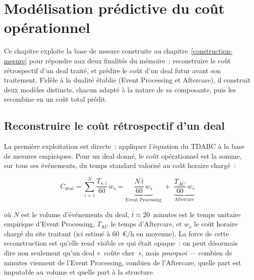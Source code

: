 \section{Modélisation prédictive du coût opérationnel}
\label{modelisation}

Ce chapitre exploite la base de mesure construite au chapitre~\ref{construction-mesure} pour répondre aux deux finalités du mémoire~: reconstruire le coût rétrospectif d'un deal traité, et prédire le coût d'un deal futur avant son traitement. Fidèle à la dualité établie (Event Processing et Aftercare), il construit deux modèles distincts, chacun adapté à la nature de sa composante, puis les recombine en un coût total prédit.

\subsection{Reconstruire le coût rétrospectif d'un deal}
\label{sec:cout-retro}

La première exploitation est directe~: appliquer l'équation du TDABC à la base de mesures empiriques. Pour un deal donné, le coût opérationnel est la somme, sur tous ses événements, du temps standard valorisé au coût horaire chargé~:

\begin{equation}
C_{deal} = \sum_{i=1}^{N} \frac{T_{s,i}}{60}\,w_s
= \underbrace{\frac{N\,\bar{t}}{60}\,w_s}_{\text{Event Processing}}
\;+\; \underbrace{\frac{T_{AC}}{60}\,w_s}_{\text{Aftercare}}
\end{equation}

\noindent où $N$ est le volume d'événements du deal, $\bar{t}\approx 20$~minutes est le temps unitaire empirique d'Event Processing, $T_{\text{AC}}$ le temps d'Aftercare, et $w_{s}$ le coût horaire chargé du site traitant (ici estimé à 60~€/h en moyenne).
La force de cette reconstruction est qu'elle rend visible ce qui était opaque~: on peut désormais dire non seulement qu'un deal «~coûte cher~», mais \emph{pourquoi} --- combien de minutes viennent de l'Event Processing, combien de l'Aftercare, quelle part est imputable au volume et quelle part à la structure.


